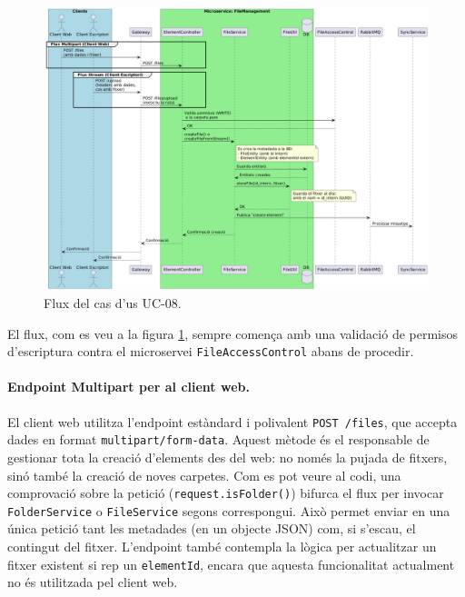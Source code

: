 \begin{figure}[H]
    \centering
    \includegraphics[width=\textwidth]{Figures/flux/upload_files_both.png}
    \caption{Flux del cas d'us UC-08.}
    \label{fig:c08-flow}
\end{figure}

El flux, com es veu a la figura \ref{fig:c08-flow}, sempre comença amb una validació de permisos d'escriptura contra el microservei \texttt{FileAccessControl} abans de procedir.

\paragraph{Endpoint Multipart per al client web.} El client web utilitza l'endpoint estàndard i polivalent \texttt{POST /files}, que accepta dades en format \texttt{multipart/form-data}. Aquest mètode és el responsable de gestionar tota la creació d'elements des del web: no només la pujada de fitxers, sinó també la creació de noves carpetes. Com es pot veure al codi, una comprovació sobre la petició (\texttt{request.isFolder()}) bifurca el flux per invocar \texttt{FolderService} o \texttt{FileService} segons correspongui. Això permet enviar en una única petició tant les metadades (en un objecte JSON) com, si s'escau, el contingut del fitxer. L'endpoint també contempla la lògica per actualitzar un fitxer existent si rep un \texttt{elementId}, encara que aquesta funcionalitat actualment no és utilitzada pel client web.

